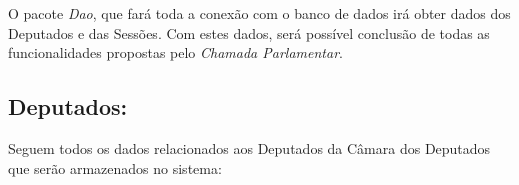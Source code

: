 
O pacote \textit{Dao}, que fará toda a conexão com o banco de dados irá obter dados dos Deputados e das Sessões. Com estes dados, será possível conclusão de todas as funcionalidades propostas pelo \textit{Chamada Parlamentar}.

\subsection{Deputados:}
	
	Seguem todos os dados relacionados aos Deputados da Câmara dos Deputados que serão armazenados no sistema:

